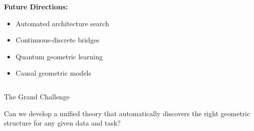 \begin{frame}[fragile]
\begin{columns}
\begin{column}{0.5\textwidth}
\textbf{Future Directions:}
\begin{itemize}
\item Automated architecture search
\item Continuous-discrete bridges
\item Quantum geometric learning
\item Causal geometric models
\end{itemize}
\end{column}
\end{columns}

\begin{alertblock}{The Grand Challenge}
\begin{center}
Can we develop a unified theory that automatically discovers the right geometric structure for any given data and task?
\end{center}
\end{alertblock}

\end{frame}
